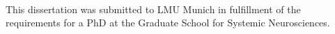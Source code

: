 
\thispagestyle{empty}

\hfill


\begin{center}
\myName \\
\smallskip
\textit{\myTitle}
\end{center}

\medskip

\noindent
This dissertation was submitted to LMU Munich in fulfillment of the requirements for a PhD at the Graduate School for Systemic Neurosciences.

\bigskip

\noindent
\textsf{}

\noindent
{}\,\mail{\myEmail}